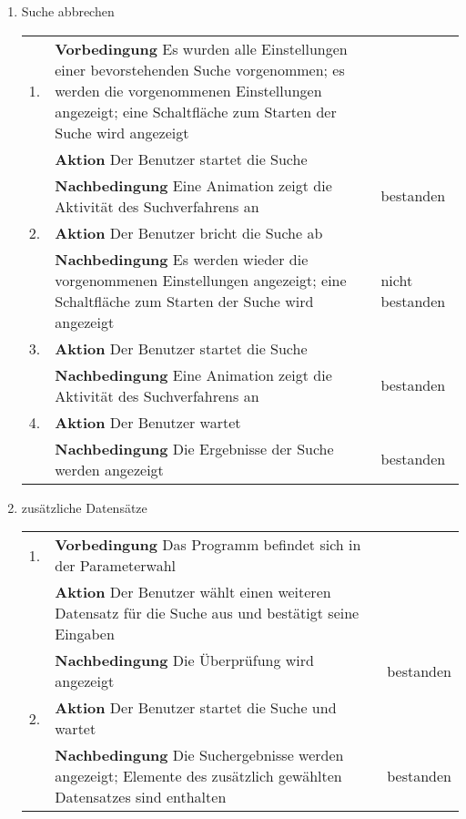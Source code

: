 \begin{enumerate} [label=\bfseries /TSW \arabic*0/, leftmargin=*]
	\item Suche abbrechen \label{ts:suche_abbrechen} \newline \newline
	\begin{tabular}{rp{4in}|l}
	1. & \textbf{Vorbedingung} Es wurden alle Einstellungen einer bevorstehenden Suche vorgenommen; es werden die vorgenommenen Einstellungen angezeigt; eine Schaltfläche zum Starten der Suche wird angezeigt & \\
	   & \textbf{Aktion} Der Benutzer startet die Suche & \\
	   & \textbf{Nachbedingung} Eine Animation zeigt die Aktivität des Suchverfahrens an & bestanden \\
	\hline
	2. & \textbf{Aktion} Der Benutzer bricht die Suche ab & \\
	   & \textbf{Nachbedingung} Es werden wieder die vorgenommenen Einstellungen angezeigt; eine Schaltfläche zum Starten der Suche wird angezeigt & nicht bestanden \\
	\hline
	3. & \textbf{Aktion} Der Benutzer startet die Suche & \\
	   & \textbf{Nachbedingung} Eine Animation zeigt die Aktivität des Suchverfahrens an & bestanden \\
	\hline
	4. & \textbf{Aktion} Der Benutzer wartet & \\
	   & \textbf{Nachbedingung} Die Ergebnisse der Suche werden angezeigt & bestanden \\
	\end{tabular}
	\newline

	\item zusätzliche Datensätze \label{ts:mehrere_datensaetze_waehlen} \newline \newline
	\begin{tabular}{rp{4in}|l}
	1. & \textbf{Vorbedingung} Das Programm befindet sich in der Parameterwahl & \\
	   & \textbf{Aktion} Der Benutzer wählt einen weiteren Datensatz für die Suche aus und bestätigt seine Eingaben & \\
	   & \textbf{Nachbedingung} Die Überprüfung wird angezeigt & bestanden \\
	\hline	
	2. & \textbf{Aktion} Der Benutzer startet die Suche und wartet & \\
	   & \textbf{Nachbedingung} Die Suchergebnisse werden angezeigt; Elemente des zusätzlich gewählten Datensatzes sind enthalten & bestanden \\
	\end{tabular}
	\newline


\end{enumerate}
